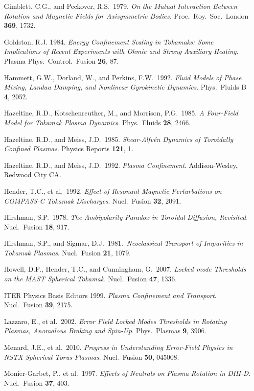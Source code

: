 \documentclass[notitlepage,12pt]{article}
\begin{document}
\begin{description}
\item Gimblett, C.G., and Peckover, R.S.\ 1979. {\em On the Mutual Interaction Between Rotation and Magnetic Fields
for Axisymmetric Bodies.} Proc.\ Roy.\ Soc.\ London {\bf 369}, 1732. 
\item Goldston, R.J. 1984. {\em Energy Confinement Scaling in Tokamaks: Some Implications of Recent Experiments with Ohmic and Strong Auxiliary Heating}. Plasma Phys.\ Control.\ Fusion {\bf 26}, 87. 
\item Hammett, G.W., Dorland, W., and Perkins, F.W.\ 1992.  {\em Fluid Models of Phase Mixing, Landau Damping, and Nonlinear Gyrokinetic Dynamics}. Phys.\ Fluids B {\bf 4}, 2052. 
\item Hazeltine, R.D., Kotschenreuther, M., and Morrison, P.G.\ 1985. {\em A Four-Field Model for Tokamak Plasma Dynamics}.
 Phys.\ Fluids {\bf 28}, 2466.
\item Hazeltine, R.D., and Meiss, J.D.\ 1985. {\em Shear-Alfv\'{e}n Dynamics of Toroidally Confined Plasmas}. Physics Reports {\bf 121}, 1.
\item Hazeltine, R.D., and Meiss, J.D.\ 1992. {\em Plasma Confinement}. Addison-Wesley, Redwood City CA. 
\item Hender, T.C., et al.\ 1992. {\em Effect of Resonant Magnetic Perturbations on COMPASS-C Tokamak Discharges}. Nucl.\ Fusion
{\bf 32}, 2091.  
\item Hirshman, S.P.\ 1978. {\em The Ambipolarity Paradox in Toroidal Diffusion, Revisited}. Nucl.\ Fusion {\bf 18}, 917.
\item Hirshman, S.P., and Sigmar, D.J.\ 1981.\ {\em Neoclassical Transport of Impurities in Tokamak Plasmas}. Nucl.\ Fusion {\bf 21}, 1079.
\item Howell, D.F., Hender, T.C., and Cunningham, G.\ 2007. {\em Locked mode Thresholds on the MAST Spherical Tokamak}. Nucl.\ Fusion {\bf 47}, 1336. 
\item ITER Physics Basis Editors 1999. {\em Plasma Confinement and Transport}. Nucl.\ Fusion {\bf 39}, 2175. 
\item Lazzaro, E., et al.\ 2002. {\em Error Field Locked Modes Thresholds in Rotating Plasmas, Anomalous Braking and Spin-Up}. Phys.\ Plasmas {\bf 9}, 3906. 
\item Menard, J.E., et al.\ 2010. {\em Progress in Understanding Error-Field Physics in NSTX Spherical Torus Plasmas}. Nucl.\ Fusion {\bf 50}, 045008.
\item Monier-Garbet, P., et al.\ 1997. {\em Effects of Neutrals on Plasma Rotation in DIII-D}. Nucl.\ Fusion {\bf 37}, 403.

\end{description}
\end{document}
